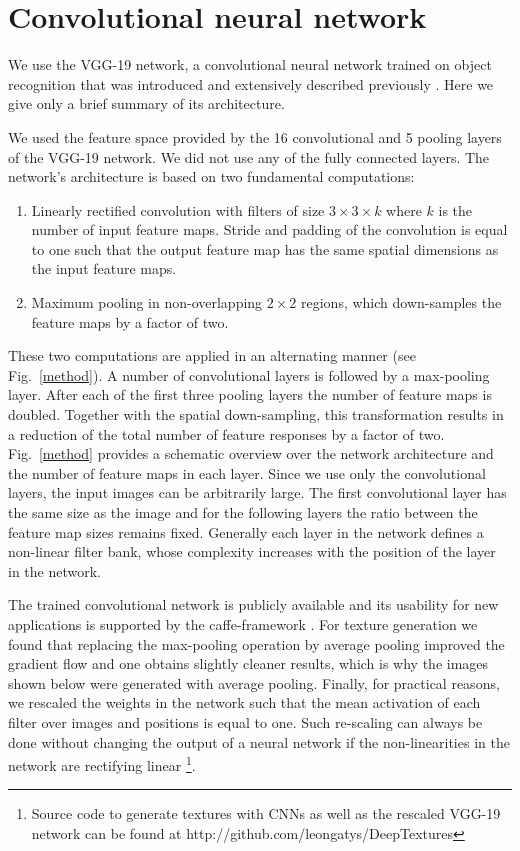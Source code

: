 \documentclass{article} %
\begin{document}
\section{Convolutional neural network}
We use the VGG-19 network, a convolutional neural network trained on object recognition that was introduced and extensively described previously \cite{simonyan_very_2014}. Here we give only a brief summary of its architecture. 

We used the feature space provided by the 16 convolutional and 5 pooling layers of the VGG-19 network. We did not use any of the fully connected layers. The network's architecture is based on two fundamental computations: 

\begin{enumerate}
\item Linearly rectified convolution with filters of size $3 \times 3 \times k$ where $k$ is the number of input feature maps. Stride and padding of the convolution is equal to one such that the output feature map has the same spatial dimensions as the input feature maps. 
\item Maximum pooling in non-overlapping $2 \times 2$ regions, which down-samples the feature maps by a factor of two.
\end{enumerate}

These two computations are applied in an alternating manner (see Fig.~\ref{method}). A number of convolutional layers is followed by a max-pooling layer. After each of the first three pooling layers the number of feature maps is doubled. Together with the spatial down-sampling, this transformation results in a reduction of the total number of feature responses by a factor of two. Fig.~\ref{method} provides a schematic overview over the network architecture and the number of feature maps in each layer. Since we use only the convolutional layers, the input images can be arbitrarily large. The first convolutional layer has the same size as the image and for the following layers the ratio between the feature map sizes remains fixed. Generally each layer in the network defines a non-linear filter bank, whose complexity increases with the position of the layer in the network. 

The trained convolutional network is publicly available and its usability for new applications is supported by the caffe-framework \cite{jia_caffe:_2014}. For texture generation we found that replacing the max-pooling operation by average pooling improved the gradient flow and one obtains slightly cleaner results, which is why the images shown below were generated with average pooling. Finally, for practical reasons, we rescaled the weights in the network such that the mean activation of each filter over images and positions is equal to one. Such re-scaling can always be done without changing the output of a neural network if the non-linearities in the network are rectifying linear \footnote{Source code to generate textures with CNNs as well as the rescaled VGG-19 network can be found at http://github.com/leongatys/DeepTextures}. 
\end{document}
